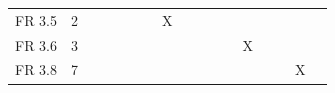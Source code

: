 \documentclass[a4paper,12pt]{article}
\begin{document}
\begin{longtable}
{\begin{tabular}{|l|c|c|c|c|c|c|c|c|c|c|c|c|c|c|c|c|}
				FR 3.5 & 2                             &                             &                             &                             &                             &                             & X                           &                             &                             &                             &                             &                             &                             &                             &                             &                             \\
				FR 3.6 & 3                             &                             &                             &                             &                             &                             &                             &                             &                             &                             &                             & X                           &                             &                             &                             &                             \\
				FR 3.8 & 7                             &                             &                             &                             &                             &                             &                             &                             &                             &                             &                             &                             &                             &                             & X                           &                             \\
				\hline
				
			\end{tabular}%
		}
	\end{longtable}
\end{document}
